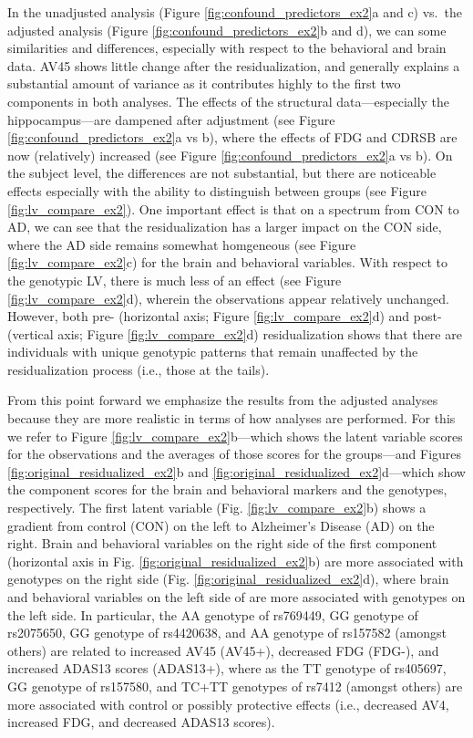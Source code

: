 \documentclass[12pt]{article}
\begin{document}
In the unadjusted analysis (Figure \ref{fig:confound_predictors_ex2}a
and c) vs.~the adjusted analysis (Figure
\ref{fig:confound_predictors_ex2}b and d), we can some similarities and
differences, especially with respect to the behavioral and brain data.
AV45 shows little change after the residualization, and generally
explains a substantial amount of variance as it contributes highly to
the first two components in both analyses. The effects of the structural
data---especially the hippocampus---are dampened after adjustment (see
Figure \ref{fig:confound_predictors_ex2}a vs b), where the effects of
FDG and CDRSB are now (relatively) increased (see Figure
\ref{fig:confound_predictors_ex2}a vs b). On the subject level, the
differences are not substantial, but there are noticeable effects
especially with the ability to distinguish between groups (see Figure
\ref{fig:lv_compare_ex2}). One important effect is that on a spectrum
from CON to AD, we can see that the residualization has a larger impact
on the CON side, where the AD side remains somewhat homgeneous (see
Figure \ref{fig:lv_compare_ex2}c) for the brain and behavioral
variables. With respect to the genotypic LV, there is much less of an
effect (see Figure \ref{fig:lv_compare_ex2}d), wherein the observations
appear relatively unchanged. However, both pre- (horizontal axis; Figure
\ref{fig:lv_compare_ex2}d) and post- (vertical axis; Figure
\ref{fig:lv_compare_ex2}d) residualization shows that there are
individuals with unique genotypic patterns that remain unaffected by the
residualization process (i.e., those at the tails).

From this point forward we emphasize the results from the adjusted
analyses because they are more realistic in terms of how analyses are
performed. For this we refer to Figure \ref{fig:lv_compare_ex2}b---which
shows the latent variable scores for the observations and the averages
of those scores for the groups---and Figures
\ref{fig:original_residualized_ex2}b and
\ref{fig:original_residualized_ex2}d---which show the component scores
for the brain and behavioral markers and the genotypes, respectively.
The first latent variable (Fig. \ref{fig:lv_compare_ex2}b) shows a
gradient from control (CON) on the left to Alzheimer's Disease (AD) on
the right. Brain and behavioral variables on the right side of the first
component (horizontal axis in Fig. \ref{fig:original_residualized_ex2}b)
are more associated with genotypes on the right side (Fig.
\ref{fig:original_residualized_ex2}d), where brain and behavioral
variables on the left side of are more associated with genotypes on the
left side. In particular, the AA genotype of rs769449, GG genotype of
rs2075650, GG genotype of rs4420638, and AA genotype of rs157582
(amongst others) are related to increased AV45 (AV45+), decreased FDG
(FDG-), and increased ADAS13 scores (ADAS13+), where as the TT genotype
of rs405697, GG genotype of rs157580, and TC+TT genotypes of rs7412
(amongst others) are more associated with control or possibly protective
effects (i.e., decreased AV4, increased FDG, and decreased ADAS13
scores).
\end{document}
